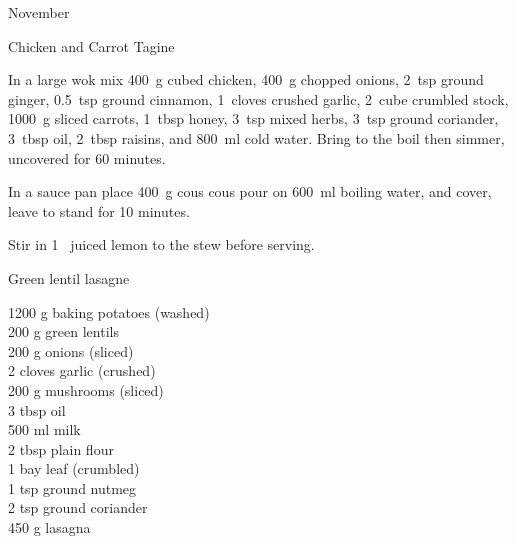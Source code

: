 \begin{menu}{November}
\begin{recipe}{2}{Chicken and Carrot Tagine}
\begin{ingredients}
		\end{ingredients}
	
    \begin{instructions}
    \item 
        In a large wok mix
        400~g cubed chicken,
        400~g chopped onions,
        2~tsp  ground ginger,
        0.5~tsp  ground cinnamon,
        1~cloves crushed garlic,
        2~cube crumbled stock,
        1000~g sliced carrots,
        1~tbsp  honey,
        3~tsp  mixed herbs,
        3~tsp  ground coriander,
        3~tbsp  oil,
        2~tbsp  raisins,
        and
        800~ml  cold water.
        Bring to the boil
        then simmer, uncovered for 60 minutes.
      \item 
      In a
      sauce pan 
      place
      400~g  cous cous
      pour on
      600~ml  boiling water,
      and cover, leave to stand for 10 minutes.
    \item 
        Stir in 
        1~ juiced lemon
        to the stew
        before serving.
      
    \end{instructions}
    \end{recipe}%
  
    \begin{recipe}{2}{Green lentil lasagne}%
		\begin{ingredients}
		1200 g baking potatoes (washed) \\
	200 g green lentils  \\
	200 g onions (sliced) \\
	2 cloves garlic (crushed) \\
	200 g mushrooms (sliced) \\
	3 tbsp oil  \\
	500 ml milk  \\
	2 tbsp plain flour  \\
	1  bay leaf (crumbled) \\
	1 tsp ground nutmeg  \\
	2 tsp ground coriander  \\
	450 g lasagna  \\
	
		\end{ingredients}
	

\end{recipe}
\end{menu}
